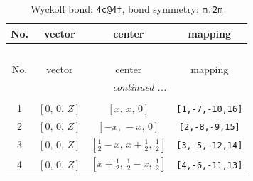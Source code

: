 \documentclass[fleqn,8pt]{jsarticle}
\begin{document}
\renewcommand{\arraystretch}{1.2}
\begin{longtable}{cccc}
\caption{Wyckoff bond: {\tt 4c@4f}, bond symmetry: {\tt m.2m}}
 \\
 \hline \hline
No. & vector & center & mapping \\ \hline \endfirsthead

\multicolumn{3}{l}{\tablename\ \thetable{}} \\
 \hline \hline
No. & vector & center & mapping \\ \hline \endhead

 \hline \hline
\multicolumn{3}{r}{\footnotesize\it continued ...} \\ \endfoot

 \hline \hline
\multicolumn{3}{r}{} \\ \endlastfoot

1 & $\left[ 0,\, 0,\, Z \right]$ & $\left[ x,\, x,\, 0 \right]$ & {\tt [1,-7,-10,16]} \\ \hline
2 & $\left[ 0,\, 0,\, Z \right]$ & $\left[ - x,\, - x,\, 0 \right]$ & {\tt [2,-8,-9,15]} \\ \hline
3 & $\left[ 0,\, 0,\, Z \right]$ & $\left[ \frac{1}{2} - x,\, x + \frac{1}{2},\, \frac{1}{2} \right]$ & {\tt [3,-5,-12,14]} \\ \hline
4 & $\left[ 0,\, 0,\, Z \right]$ & $\left[ x + \frac{1}{2},\, \frac{1}{2} - x,\, \frac{1}{2} \right]$ & {\tt [4,-6,-11,13]} \\
\end{longtable}
\renewcommand{\arraystretch}{1.2}
\end{document}
